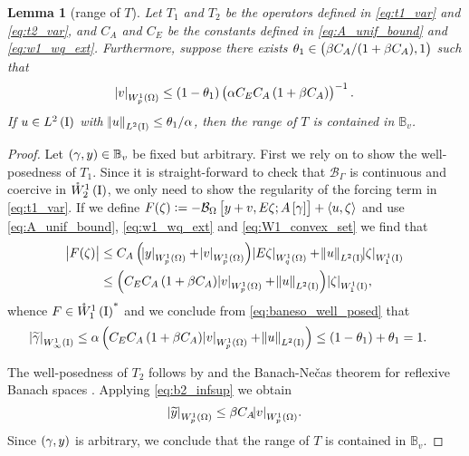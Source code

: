 \documentclass[final]{siamltex}
\newtheorem{lem}[theorem]{Lemma}
\begin{document}
\begin{lem}[range of $T$] \label{lem:t_maps_weps}
Let $T_1$ and $T_2$ be the operators defined in \eqref{eq:t1_var} and \eqref{eq:t2_var}, and $C_A$ and $C_E$ be the constants defined in \eqref{eq:A_unif_bound} and \eqref{eq:w1_wq_ext}. Furthermore, suppose there exists $\theta_1 \in \del{\beta C_A/(1+\beta C_A),1}$ such that 
	\begin{align}\label{eq:v_invariant}
		{\abs{{v}}_{{W^{{1}}_{{p}}\del{{\Omega}}}}} \leq \del{1-\theta_1}\del{\alpha C_E C_A\del{1+\beta C_A}}^{-1}. 
	\end{align}
If $u \in {{L^2\del{{\text{\rm I}}}}}$ with ${\norm{{u}}_{{L^2\del{{{\text{\rm I}}}}}}} \leq \theta_1/\alpha$, then the range of $T$ is contained in ${\mathbb{B}}_v$.

\end{lem}
\begin{proof} Let $\del{\gamma, y} \in {\mathbb{B}}_v$ be fixed but arbitrary. First we rely on  to show the well-posedness of $T_1$. Since it is straight-forward to check that 
${{\mathcal{B}}_\Gamma}$ is continuous and coercive in ${{\mathring{W}^{1}_{2}\del{{\text{\rm I}}}}}$, we only need to show the regularity of the forcing term in \eqref{eq:t1_var}. If we define 
$F(\zeta) := -{{\mathcal{B}}_\Omega}\sbr{y + v,E\zeta;A\sbr{\gamma}} + {\left\langle {u,\zeta} \right\rangle}$  and use \eqref{eq:A_unif_bound}, \eqref{eq:w1_wq_ext} and \eqref{eq:W1_convex_set} we find that
\begin{align} \label{eq:chi_w1}
   \abs{F(\zeta)} 
   			&\le C_A \del{{\abs{{y}}_{{W^{{{1}}}_{{{p}}}\del{{{\Omega}}}}}} + {\abs{{v}}_{{W^{{{1}}}_{{{p}}}\del{{{\Omega}}}}}}} {\abs{{E\zeta}}_{{W^{{{1}}}_{{{q}}}\del{{{\Omega}}}}}} 
   				+{\norm{{u}}_{{L^2\del{{{\text{\rm I}}}}}}}{\abs{{\zeta}}_{{W^{{{1}}}_{{{1}}}\del{{\text{\rm I}}}}}} \nonumber\\ 
   			&\le \del{C_E C_A \del{1+\beta C_A}{\abs{{v}}_{{W^{{{1}}}_{{{p}}}\del{{{\Omega}}}}}}
   				+ {\norm{{u}}_{{L^2\del{{{\text{\rm I}}}}}}}}{\abs{{\zeta}}_{{W^{{{1}}}_{{{1}}}\del{{\text{\rm I}}}}}}, 
\end{align}
whence $F \in {{\mathring{W}^{1}_{1}\del{{\text{\rm I}}}}}^*$ and we conclude from \eqref{eq:baneso_well_posed} that
\begin{align*}
       {\abs{\widetilde{\gamma}}_{{W^{{{1}}}_{{{\infty}}}\del{{\text{\rm I}}}}}} 		
    &\leq \alpha\del{C_E C_A \del{1+\beta C_A}{\abs{{v}}_{{W^{{{1}}}_{{{p}}}\del{{{\Omega}}}}}}
   				+ {\norm{{u}}_{{L^2\del{{{\text{\rm I}}}}}}}} 
    \leq \del{1-\theta_1} + \theta_1  = 1.
\end{align*}		   

The well-posedness of $T_2$ follows by  and
 the Banach-Ne\v{c}as theorem for reflexive Banach spaces \cite[Theorem 2.6]{AErn_JLGuermond_2004a}. Applying \eqref{eq:b2_infsup} we obtain
	\[
    	{\abs{\widetilde{y}}_{{W^{{{1}}}_{{{p}}}\del{{{\Omega}}}}}} \leq  \beta C_A {\abs{{v}}_{{W^{{{1}}}_{{{p}}}\del{{{\Omega}}}}}}.
	\] 
Since $\del{\gamma, y}$ is arbitrary, we conclude that the range of $T$ is contained in ${\mathbb{B}}_v$.
\end{proof}
\end{document}
